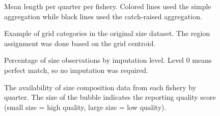 \documentclass[
]{scrartcl}
\begin{document}
\newpage{}

\begin{figure}


\caption{\label{fig-mlen}Mean length per quarter per fishery. Colored
lines used the simple aggregation while black lines used the
catch-raised aggregation.}

\end{figure}%

\newpage{}

\begin{figure}


\caption{\label{fig-map-grid-agg1}Example of grid categories in the
original size dataset. The region assignment was done based on the grid
centroid.}

\end{figure}%

\newpage{}

\begin{figure}


\caption{\label{fig-imputation}Percentage of size observations by
imputation level. Level 0 means perfect match, so no imputation was
required.}

\end{figure}%

\newpage{}

\begin{figure}


\caption{\label{fig-rq-size}The availability of size composition data
from each fishery by quarter. The size of the bubble indicates the
reporting quality score (small size = high quality, large size = low
quality).}

\end{figure}%
\end{document}
